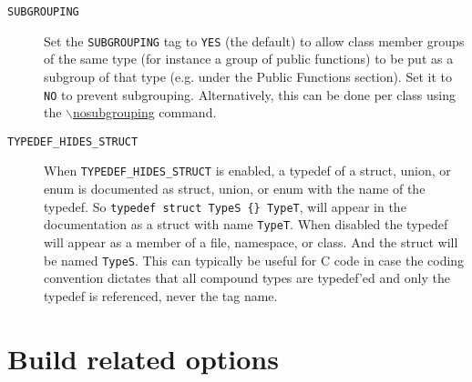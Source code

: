 \begin{description}
\label{config_cfg_subgrouping}
\hypertarget{config_cfg_subgrouping}{}
 \item[{\tt SUBGROUPING} ] Set the {\tt SUBGROUPING} tag to {\tt YES} (the default) to allow class member groups of the same type (for instance a group of public functions) to be put as a subgroup of that type (e.g. under the Public Functions section). Set it to {\tt NO} to prevent subgrouping. Alternatively, this can be done per class using the \hyperlink{commands_cmdnosubgrouping}{$\backslash$nosubgrouping} command.

\label{config_cfg_typedef_hides_struct}
\hypertarget{config_cfg_typedef_hides_struct}{}
 \item[{\tt TYPEDEF\_\-HIDES\_\-STRUCT} ] When {\tt TYPEDEF\_\-HIDES\_\-STRUCT} is enabled, a typedef of a struct, union, or enum is documented as struct, union, or enum with the name of the typedef. So {\tt typedef struct TypeS \{\} TypeT}, will appear in the documentation as a struct with name {\tt TypeT}. When disabled the typedef will appear as a member of a file, namespace, or class. And the struct will be named {\tt TypeS}. This can typically be useful for C code in case the coding convention dictates that all compound types are typedef'ed and only the typedef is referenced, never the tag name.

\end{description}
\hypertarget{config_config_build}{}\section{Build related options}\label{config_config_build}
\label{config_cfg_extract_all}
\hypertarget{config_cfg_extract_all}{}
